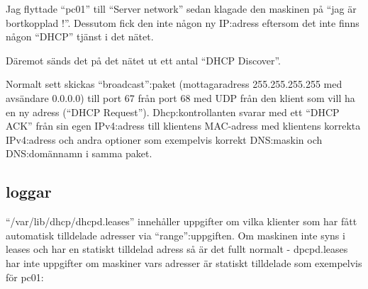 \documentclass[swedish,11pt,a4paper]{article}
\begin{document}
    Jag flyttade ``pc01'' till  ``Server network'' sedan klagade den maskinen på ``jag är bortkopplad !''.
    Dessutom fick den inte någon ny IP:adress eftersom det inte finns någon ``DHCP'' tjänst i det nätet.

    Däremot sänds det på det nätet ut ett antal ``DHCP Discover''.

    Normalt sett skickas ``broadcast'':paket (mottagaradress 255.255.255.255 med avsändare 0.0.0.0) till port 67 från port 68 med UDP från
    den klient som vill ha en ny adress (``DHCP Request''). Dhcp:kontrollanten svarar med ett ``DHCP ACK'' från sin
    egen IPv4:adress till klientens MAC-adress med klientens korrekta IPv4:adress och andra optioner som exempelvis
    korrekt DNS:maskin och DNS:domännamn i samma paket.

    \newpage

    \subsection{loggar}

    ``/var/lib/dhcp/dhcpd.leases'' innehåller uppgifter om vilka klienter som har fått
    automatisk tilldelade adresser via ``range'':uppgiften. Om maskinen inte syns i leases och
    har en statiskt tilldelad adress så är det fullt normalt - dpcpd.leases har inte
    uppgifter om maskiner vars adresser är statiskt tilldelade
    som exempelvis för pc01:



\end{document}
